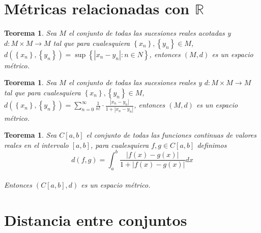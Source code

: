 \documentclass[oneside]{book} %
\theoremstyle{Teorema}
\newtheorem{Teorema}[Definicion]{Teorema}
\theoremstyle{Ejemplos}
\theoremstyle{[Obs]}
\newcommand{\abs}[1]{\left|#1\right|} %
\renewcommand{\{}{\left\lbrace} %
\renewcommand{\}}{\right\rbrace} %
\newcommand{\R}{\mathbb{R}} %
\begin{document}
		\section{Métricas relacionadas con $\R$}

			\begin{Teorema}
				
				Sea $M$ el conjunto de todas las sucesiones reales acotadas y $d : M \times M \to M$ tal que para cualesquiera $\{ x_n \}, \{ y_n \} \in M$, $d(\{ x_n \}, \{ y_n \}) = \sup\{ \abs{ x_n - y_n} : n \in N \}$, entonces $(M, d)$ es un espacio métrico. \\

			\end{Teorema}

			\begin{Teorema}
				
				Sea $M$ el conjunto de todas las sucesiones reales y $d : M \times M \to M$ tal que para cualesquiera $\{ x_n \}, \{ y_n \} \in M$, $d(\{ x_n \}, \{ y_n \}) = \displaystyle\sum_{n = 0}^{\infty} \frac{1}{n!} \cdot \frac{\abs{x_n - y_n}}{1 + \abs{x_n - y_n}}$, entonces $(M, d)$ es un espacio métrico. \\

			\end{Teorema}

			\begin{Teorema}
				
				Sea $C[a, b]$ el conjunto de todas las funciones continuas de valores reales en el intervalo $[a, b]$, para cualesquiera $f, g \in C[a, b]$ definimos \\

				\[ d(f, g) = \int_{a}^{b} \frac{\abs{f(x) - g(x)}}{1 + \abs{f(x) - g(x)}} dx \] \\

				Entonces $(C[a, b], d)$ es un espacio métrico. \\

			\end{Teorema}

		\section{Distancia entre conjuntos}
\end{document}
